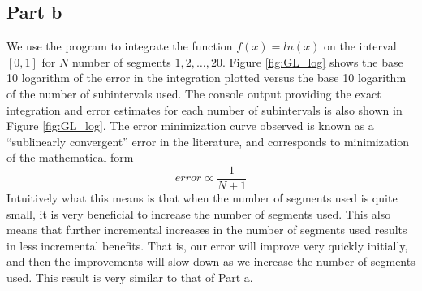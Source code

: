 \documentclass[11pt]{article}
\begin{document}
\FloatBarrier
\subsection*{Part b}
We use the program to integrate the function $f(x) = ln(x)$ on the interval $[0, 1]$ for $N$ number of segments $1, 2, \ldots , 20$. Figure \ref{fig:GL_log} shows the base 10 logarithm of the error in the integration plotted versus the base 10 logarithm of the number of subintervals used. The console output providing the exact integration and error estimates for each number of subintervals is also shown in Figure \ref{fig:GL_log}. The error minimization curve observed is known as a ``sublinearly convergent'' error in the literature, and corresponds to minimization of the mathematical form
$$ error \propto \frac{1}{N + 1} $$
Intuitively what this means is that when the number of segments used is quite small, it is very beneficial to increase the number of segments used. This also means that further incremental increases in the number of segments used results in less incremental benefits. That is, our error will improve very quickly initially, and then the improvements will slow down as we increase the number of segments used. This result is very similar to that of Part a.
\end{document}
